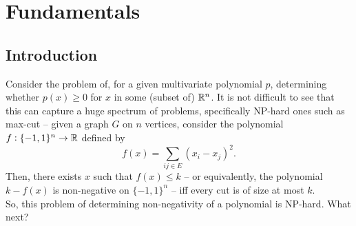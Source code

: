 
\section{Fundamentals}

\subsection{Introduction}

	Consider the problem of, for a given multivariate polynomial $p$, determining whether $p(x) \ge 0$ for $x$ in some (subset of) $\mathbb{R}^n$. It is not difficult to see that this can capture a huge spectrum of problems, specifically NP-hard ones such as max-cut -- given a graph $G$ on $n$ vertices, consider the polynomial $f : \{-1,1\}^n \to \mathbb{R}$ defined by
	\[ f(x) = \sum_{ij \in E} (x_i - x_j)^2. \]
	Then, there exists $x$ such that $f(x) \le k$ -- or equivalently, the polynomial $k - f(x)$ is non-negative on $\{-1,1\}^n$ -- iff every cut is of size at most $k$.\\
	So, this problem of determining non-negativity of a polynomial is NP-hard. What next?\\

